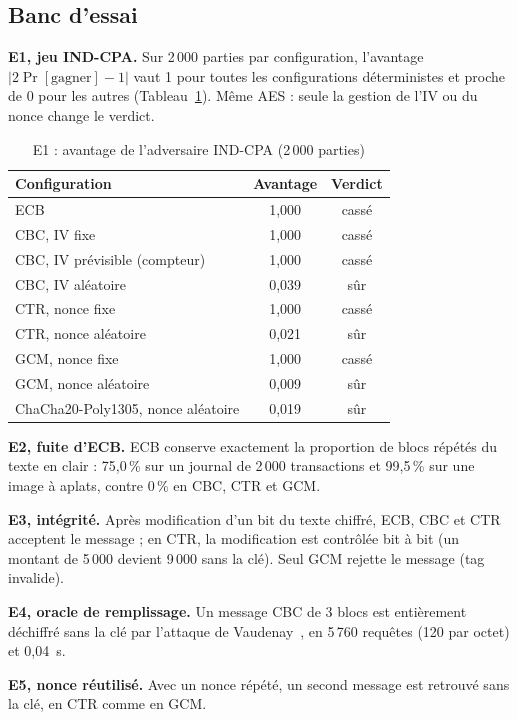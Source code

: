 \documentclass[conference,a4paper]{IEEEtran}
\begin{document}
\subsection{Banc d'essai}

\textbf{E1, jeu IND-CPA.} Sur 2\,000 parties par configuration, l'avantage $|2\Pr[\text{gagner}]-1|$ vaut 1 pour toutes les configurations déterministes et proche de 0 pour les autres (Tableau~\ref{tab:e1}). Même AES : seule la gestion de l'IV ou du nonce change le verdict.

\begin{table}[t]
\caption{E1 : avantage de l'adversaire IND-CPA (2\,000 parties)}
\label{tab:e1}
\centering\small
\begin{tabular}{lcc}
\toprule
Configuration & Avantage & Verdict \\
\midrule
ECB & 1,000 & cassé \\
CBC, IV fixe & 1,000 & cassé \\
CBC, IV prévisible (compteur) & 1,000 & cassé \\
CBC, IV aléatoire & 0,039 & sûr \\
CTR, nonce fixe & 1,000 & cassé \\
CTR, nonce aléatoire & 0,021 & sûr \\
GCM, nonce fixe & 1,000 & cassé \\
GCM, nonce aléatoire & 0,009 & sûr \\
ChaCha20-Poly1305, nonce aléatoire & 0,019 & sûr \\
\bottomrule
\end{tabular}
\end{table}

\textbf{E2, fuite d'ECB.} ECB conserve exactement la proportion de blocs répétés du texte en clair : 75,0\,\% sur un journal de 2\,000 transactions et 99,5\,\% sur une image à aplats, contre 0\,\% en CBC, CTR et GCM.

\textbf{E3, intégrité.} Après modification d'un bit du texte chiffré, ECB, CBC et CTR acceptent le message ; en CTR, la modification est contrôlée bit à bit (un montant de 5\,000 devient 9\,000 sans la clé). Seul GCM rejette le message (tag invalide).

\textbf{E4, oracle de remplissage.} Un message CBC de 3 blocs est entièrement déchiffré sans la clé par l'attaque de Vaudenay~\cite{vaudenay2002}, en 5\,760 requêtes (120 par octet) et 0,04~s.

\textbf{E5, nonce réutilisé.} Avec un nonce répété, un second message est retrouvé sans la clé, en CTR comme en GCM.
\end{document}
